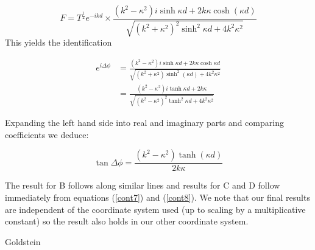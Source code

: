 \documentclass{article}
\begin{document}
\[
	F = T^{\frac{1}{2}}e^{-ikd} \times \frac{(k^2-\kappa^2)i\sinh{\kappa d}+2k\kappa \cosh(\kappa d)}{\sqrt{(k^2+\kappa^2)^2\sinh^{2}{\kappa d}+4k^2\kappa^2}}
\] 
This yields the identification

\begin{align}
	e^{i\Delta\phi} &= \frac{(k^2-\kappa^2)i\sinh{\kappa d}+2k\kappa \cosh{\kappa d}}{\sqrt{(k^2+\kappa^2)\sinh^{2}(\kappa d)+4k^2\kappa^2}} \\
			&= \frac{(k^2-\kappa^2)i\tanh{\kappa d}+2k\kappa}{\sqrt{(k^2-\kappa^2)^2\tanh^2{\kappa d}+4k^2\kappa^2}}
\end{align}

Expanding the left hand side into real and imaginary parts and comparing coefficients we deduce:

\[
	\tan{\Delta\phi} = \frac{(k^2-\kappa^2)\tanh(\kappa d)}{2k\kappa}
\] 

The result for B follows along similar lines and results for C and D follow immediately from equations (\ref{cont7}) and (\ref{cont8}). We note that our final results are independent of the coordinate system used (up to scaling by a multiplicative constant) so the result also holds in our other coordinate system.

\begin{thebibliography}{100}
Goldstein

\end{thebibliography}
\end{document}
